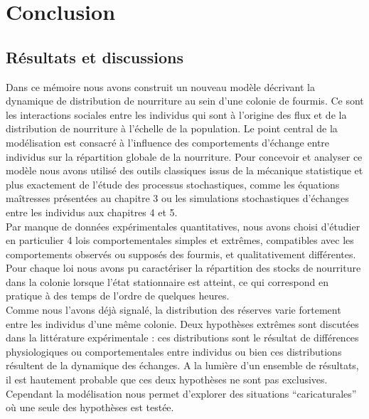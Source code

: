 \chapter{Conclusion}

\section{Résultats et discussions}


Dans ce mémoire nous avons construit un nouveau modèle décrivant la dynamique de distribution de nourriture au sein d'une colonie de fourmis. Ce sont les interactions sociales entre les individus qui sont à l'origine des flux et de la distribution de nourriture à l'échelle de la population. Le point central de la modélisation est consacré à l'influence des comportements d'échange entre individus sur la répartition globale de la nourriture. Pour concevoir et analyser ce modèle nous avons utilisé des outils classiques issus de la mécanique statistique et plus exactement de l'étude des processus stochastiques, comme les équations maîtresses présentées au chapitre 3 ou les simulations stochastiques d'échanges entre les individus aux chapitres 4 et 5. \\

Par manque de données expérimentales quantitatives, nous avons choisi d'étudier en particulier 4 lois comportementales simples et extrêmes, compatibles avec les comportements observés ou supposés des fourmis, et qualitativement différentes. Pour chaque loi nous avons pu caractériser la répartition des stocks de nourriture dans la colonie lorsque l'état stationnaire est atteint, ce qui correspond en pratique à des temps de l'ordre de quelques heures.\\

Comme nous l'avons déjà signalé, la distribution des réserves varie fortement entre les individus d'une même colonie. Deux hypothèses extrêmes sont discutées dans la littérature expérimentale \citep{Saragosti_2013}: ces distributions sont le résultat de différences physiologiques ou comportementales entre individus ou bien ces distributions résultent de la dynamique des échanges. A la lumière d'un ensemble de résultats, il est hautement probable que ces deux hypothèses ne sont pas exclusives. Cependant la modélisation nous permet d'explorer des situations ``caricaturales'' où une seule des hypothèses est testée.\\

